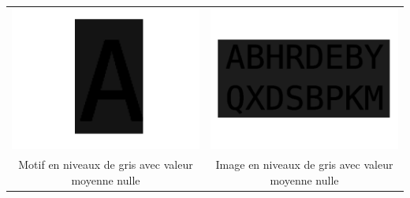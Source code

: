 \documentclass[a4paper,12pt,titlepage]{report}
\begin{document}
	\begin{tabular}{|c|c|}
			\includegraphics[scale=0.18]{illus/motifm0.png} & \includegraphics[scale=0.18]{illus/motm0.png}\\
			Motif en niveaux de gris avec valeur moyenne nulle  & Image en niveaux de gris avec valeur moyenne nulle\\
	\end{tabular}
\end{document}
